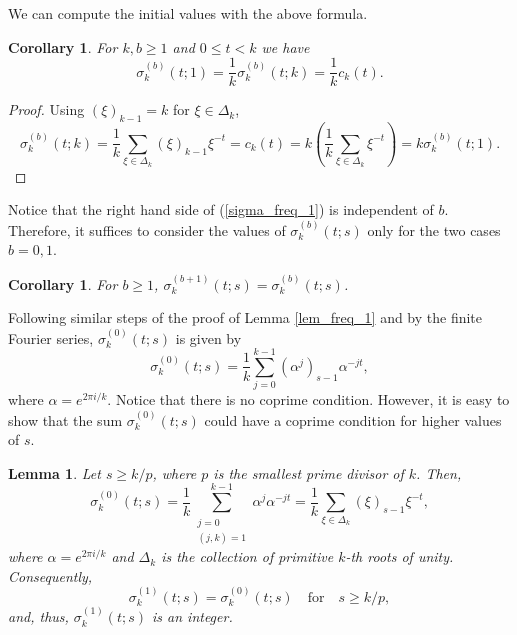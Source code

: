 \documentclass[12pt]{article}
\newtheorem{cor}[thm]{Corollary}%
\newtheorem{lem}[thm]{Lemma}%
\begin{document}
We can compute the initial values with the above formula. 

\begin{cor} \label{init_value}
For $k,b\geq 1$ and $0\leq t<k$ we have 
$$
    \sigma_{k}^{(b)}(t;1)=\frac{1}{k}\sigma_{k}^{(b)}(t;k)=\frac{1}{k}c_{k}(t).
$$
\end{cor}
\begin{proof} Using $(\xi)_{k-1}=k$ for $\xi\in \Delta_{k}$,
$$
\sigma_{k}^{(b)}(t;k)=\frac{1}{k}\sum_{\xi\in \Delta_{k}}(\xi)_{k-1}\xi^{-t}=c_{k}(t)=k\left(\frac{1}{k}\sum_{\xi\in \Delta_{k}}\xi^{-t}\right)=k\sigma^{(b)}_{k}(t;1).
$$    
\end{proof}

Notice that the right hand side of (\ref{sigma_freq_1}) is independent of $b$. Therefore, it suffices to consider the values of $\sigma^{(b)}_{k}(t;s)$ only for the two cases $b=0,1$.
\begin{cor}
For $b\geq 1$, $\sigma_{k}^{(b+1)}(t;s)=\sigma_{k}^{(b)}(t;s)$.    
\end{cor}

Following similar steps of the proof of Lemma \ref{lem_freq_1} and by the finite Fourier series, \(\sigma^{(0)}_{k}(t;s)\) is given by
\begin{equation}
\sigma^{(0)}_{k}(t;s) = \frac{1}{k} \sum_{j=0}^{k-1} (\alpha^j)_{s-1} \alpha^{-jt},
\end{equation}
where \(\alpha = e^{2\pi i / k}\). Notice that there is no coprime condition. However, it is easy to show that the sum $\sigma_{k}^{(0)}(t;s)$ could have a coprime condition for higher values of $s$. 

\begin{lem} 
Let $s \geq k/p$, where $p$ is the smallest prime divisor of $k$. Then,  
\begin{equation}\label{sigma_freq_0}
\sigma^{(0)}_{k}(t; s) = \frac{1}{k} \sum_{\substack{j=0 \\ (j, k) = 1}}^{k-1} \alpha^j \alpha^{-jt} = \frac{1}{k} \sum_{\xi \in \Delta_{k}} (\xi)_{s-1} \xi^{-t}, 
\end{equation}
where $\alpha = e^{2\pi i / k}$ and $\Delta_{k}$ is the collection of primitive $k$-th roots of unity. Consequently,
\begin{equation}
\sigma^{(1)}_{k}(t; s) = \sigma^{(0)}_{k}(t; s) \quad \text{for} \quad s \geq k/p,
\end{equation}
and, thus, $\sigma^{(1)}_{k}(t; s)$ is an integer.
\end{lem}
\end{document}
